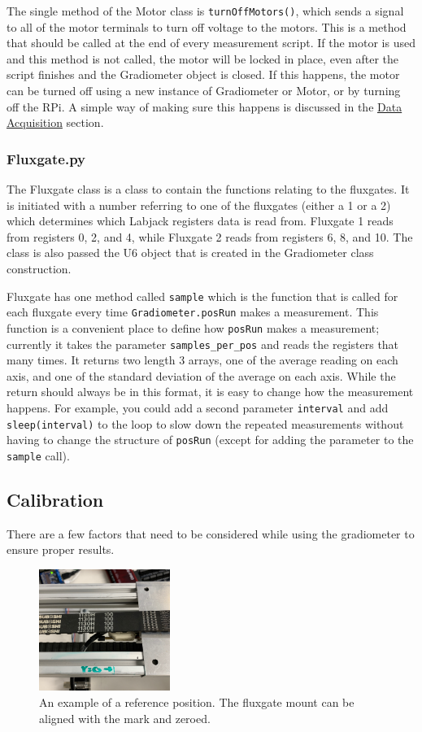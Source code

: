 \documentclass{TheMartianReport}
\newcommand{\pyinline}[1]{\texttt{#1}}
\begin{document}
The single method of the Motor class is \pyinline{turnOffMotors()}, which sends a signal to all of the motor terminals to turn off voltage to the motors. This is a method that should be called at the end of every measurement script. If the motor is used and this method is not called, the motor will be locked in place, even after the script finishes and the Gradiometer object is closed. If this happens, the motor can be turned off using a new instance of Gradiometer or Motor, or by turning off the RPi. A simple way of making sure this happens is discussed in the \hyperref[subsec:Acquisition]{Data Acquisition} section.

\subsubsection{Fluxgate.py}
The Fluxgate class is a class to contain the functions relating to the fluxgates. It is initiated with a number referring to one of the fluxgates (either a 1 or a 2) which determines which Labjack registers data is read from. Fluxgate 1 reads from registers 0, 2, and 4, while Fluxgate 2 reads from registers 6, 8, and 10. The class is also passed the U6 object that is created in the Gradiometer class construction.

Fluxgate has one method called \pyinline{sample} which is the function that is called for each fluxgate every time \pyinline{Gradiometer.posRun} makes a measurement. This function is a convenient place to define how \pyinline{posRun} makes a measurement; currently it takes the parameter \pyinline{samples_per_pos} and reads the registers that many times. It returns two length 3 arrays, one of the average reading on each axis, and one of the standard deviation of the average on each axis. While the return should always be in this format, it is easy to change how the measurement happens. For example, you could add a second parameter \pyinline{interval} and add \pyinline{sleep(interval)} to the loop to slow down the repeated measurements without having to change the structure of \pyinline{posRun} (except for adding the parameter to the \pyinline{sample} call).

\subsection{Calibration} \label{subsec:Calibration}
There are a few factors that need to be considered while using the gradiometer to ensure proper results.\begin{figure}
	\centering
	\includegraphics[width=0.38\textwidth]{calib_mark}
	\caption{An example of a reference position. The fluxgate mount can be aligned with the mark and zeroed.}
	\label{fig:CalibMark}
\end{figure}
\end{document}
